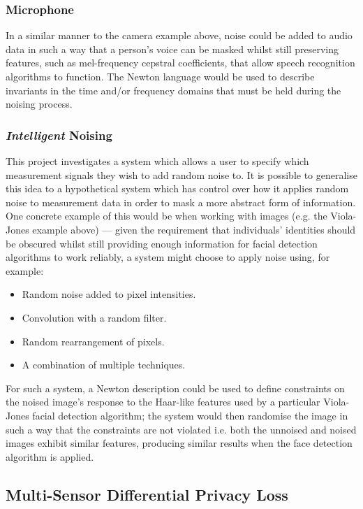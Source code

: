 \documentclass[12pt]{article}
\begin{document}
    \subsubsection{Microphone}
      In a similar manner to the camera example above, noise could be added to audio data in such a way that a person's voice can be masked whilst still preserving features, such as mel-frequency cepstral coefficients, that allow speech recognition algorithms to function. The Newton language would be used to describe invariants in the time and/or frequency domains that must be held during the noising process.

    \subsubsection{\textit{Intelligent} Noising}
      This project investigates a system which allows a user to specify which measurement signals they wish to add random noise to. It is possible to generalise this idea to a hypothetical system which has control over how it applies random noise to measurement data in order to mask a more abstract form of information. One concrete example of this would be when working with images (e.g. the  Viola-Jones example above) --- given the requirement that individuals' identities should be obscured whilst still providing enough information for facial detection algorithms to work reliably, a system might choose to apply noise using, for example:

      \begin{itemize}
        \item Random noise added to pixel intensities.
        \item Convolution with a random filter.
        \item Random rearrangement of pixels.
        \item A combination of multiple techniques.
      \end{itemize}

      For such a system, a Newton description could be used to define constraints on the noised image's response to the Haar-like features used by a particular Viola-Jones facial detection algorithm; the system would then randomise the image in such a way that the constraints are not violated i.e. both the unnoised and noised images exhibit similar features, producing similar results when the face detection algorithm is applied.

  \subsection{Multi-Sensor Differential Privacy Loss} \label{multi_sensor_differential_privacy_loss_section}
\end{document}

